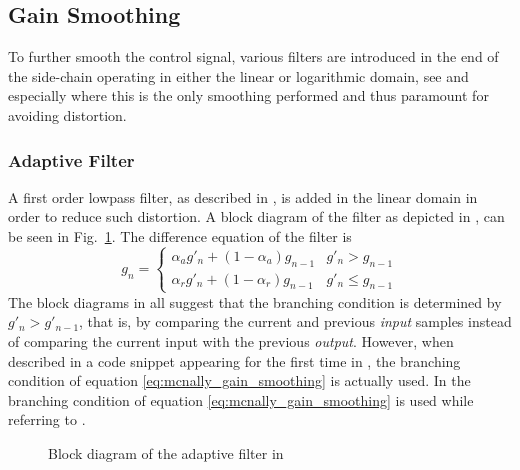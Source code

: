 \documentclass[../main2.tex]{subfiles}
\providecommand{\rootdir}{..}
\begin{document}
\FloatBarrier
\subsection{Gain Smoothing}
To further smooth the control signal, various filters are introduced in the end of the side-chain operating in either the linear or logarithmic domain, see \cite{mcnally1984dynamic}\cite{frindle1996implementation} and especially \cite{reiss2012tutorial} where this is the only smoothing performed and thus paramount for avoiding distortion.
\subsubsection{Adaptive Filter} \label{adaptive_filter}
A first order lowpass filter, as described in \cite{mcnally1984}, is added in the linear domain in order to reduce such distortion. A block diagram of the filter as depicted in \cite{mcnally1984dynamic}, can be seen in Fig.~\ref{fig:block_mcnally_theory_adap_filter}. The difference equation of the filter is
\begin{equation}
g_n = \begin{cases}
    \alpha_{a} g'_n + (1-\alpha_{a}) g_{n-1} 	& g'_n > g_{n-1} \\
    \alpha_{r} g'_n + (1-\alpha_{r}) g_{n-1} 	& g'_n \leq g_{n-1}
\end{cases}
\label{eq:mcnally_gain_smoothing}
\end{equation}
The block diagrams in \cite{mcnally1984dynamic}\cite{dafx02}\cite{dafx11}\cite{zolzer1997digital}\cite{zolzer2008digital} all suggest that the branching condition is determined by $g'_n > g'_{n-1}$, that is, by comparing the current and previous \emph{input} samples instead of comparing the current input with the previous \emph{output}. However, when described in a code snippet appearing for the first time in \cite{dafx11}, the branching condition of equation \eqref{eq:mcnally_gain_smoothing} is actually used. In \cite{bitzer2006parameter} the branching condition of equation \eqref{eq:mcnally_gain_smoothing} is used while referring to \cite{mcnally1984dynamic}\cite{dafx02}.
\begin{figure}
\centerline{}
\caption{Block diagram of the adaptive filter in \cite{mcnally1984dynamic}}
\label{fig:block_mcnally_theory_adap_filter}
\end{figure}
\end{document}
